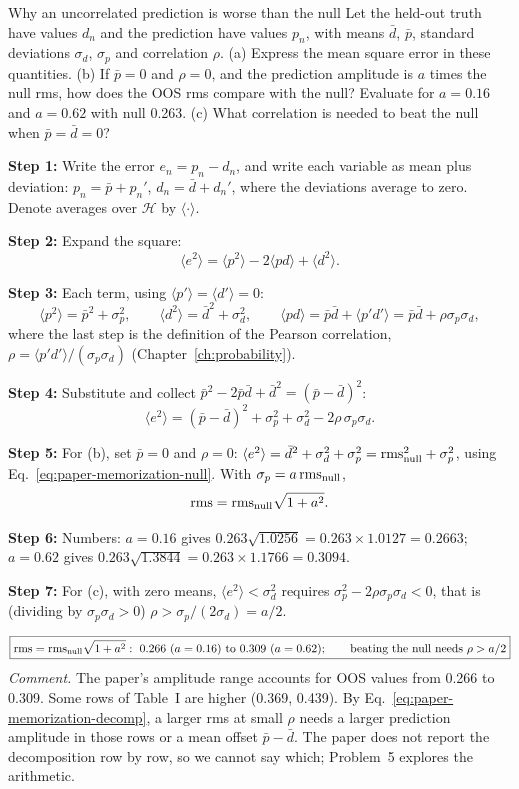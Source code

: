 \begin{sample}{Why an uncorrelated prediction is worse than the null}
Let the held-out truth have values $d_n$ and the prediction have values $p_n$, with means $\bar d$, $\bar p$, standard deviations $\sigma_d$, $\sigma_p$ and correlation $\rho$. (a) Express the mean square error in these quantities. (b) If $\bar p=0$ and $\rho=0$, and the prediction amplitude is $a$ times the null rms, how does the OOS rms compare with the null? Evaluate for $a=0.16$ and $a=0.62$ with null 0.263. (c) What correlation is needed to beat the null when $\bar p=\bar d=0$?

\textbf{Step 1:} Write the error $e_n=p_n-d_n$, and write each variable as mean plus deviation: $p_n=\bar p+p_n'$, $d_n=\bar d+d_n'$, where the deviations average to zero. Denote averages over $\mathcal H$ by $\langle\cdot\rangle$.

\textbf{Step 2:} Expand the square:
\[
\langle e^2\rangle=\langle p^2\rangle-2\langle pd\rangle+\langle d^2\rangle .
\]

\textbf{Step 3:} Each term, using $\langle p'\rangle=\langle d'\rangle=0$:
\[
\langle p^2\rangle=\bar p^2+\sigma_p^2,\qquad
\langle d^2\rangle=\bar d^2+\sigma_d^2,\qquad
\langle pd\rangle=\bar p\bar d+\langle p'd'\rangle=\bar p\bar d+\rho\sigma_p\sigma_d ,
\]
where the last step is the definition of the Pearson correlation, $\rho=\langle p'd'\rangle/(\sigma_p\sigma_d)$ (Chapter~\ref{ch:probability}).

\textbf{Step 4:} Substitute and collect $\bar p^2-2\bar p\bar d+\bar d^2=(\bar p-\bar d)^2$:
\begin{equation}
\langle e^2\rangle=(\bar p-\bar d)^2+\sigma_p^2+\sigma_d^2-2\rho\,\sigma_p\sigma_d .
\label{eq:paper-memorization-decomp}
\end{equation}

\textbf{Step 5:} For (b), set $\bar p=0$ and $\rho=0$: $\langle e^2\rangle=\bar d^2+\sigma_d^2+\sigma_p^2=\mathrm{rms}_{\rm null}^2+\sigma_p^2$, using Eq.~\eqref{eq:paper-memorization-null}. With $\sigma_p=a\,\mathrm{rms}_{\rm null}$,
\[
\mathrm{rms}=\mathrm{rms}_{\rm null}\sqrt{1+a^2}.
\]

\textbf{Step 6:} Numbers: $a=0.16$ gives $0.263\sqrt{1.0256}=0.263\times1.0127=0.2663$; $a=0.62$ gives $0.263\sqrt{1.3844}=0.263\times1.1766=0.3094$.

\textbf{Step 7:} For (c), with zero means, $\langle e^2\rangle<\sigma_d^2$ requires $\sigma_p^2-2\rho\sigma_p\sigma_d<0$, that is (dividing by $\sigma_p\sigma_d>0$) $\rho>\sigma_p/(2\sigma_d)=a/2$.

\[
\boxed{\mathrm{rms}=\mathrm{rms}_{\rm null}\sqrt{1+a^2}:\ 0.266\ (a=0.16)\ \text{to}\ 0.309\ (a=0.62);\qquad \text{beating the null needs}\ \rho>a/2}
\]
\emph{Comment.} The paper's amplitude range accounts for OOS values from 0.266 to 0.309. Some rows of Table~I are higher (0.369, 0.439). By Eq.~\eqref{eq:paper-memorization-decomp}, a larger rms at small $\rho$ needs a larger prediction amplitude in those rows or a mean offset $\bar p-\bar d$. The paper does not report the decomposition row by row, so we cannot say which; Problem~5 explores the arithmetic.
\end{sample}

